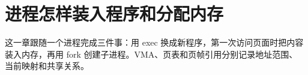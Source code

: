 \chapter{进程怎样装入程序和分配内存}

这一章跟随一个进程完成三件事：用 exec 换成新程序，第一次访问页面时把内容
装入内存，再用 fork 创建子进程。VMA、页表和页帧引用分别记录地址范围、
当前映射和共享关系。






